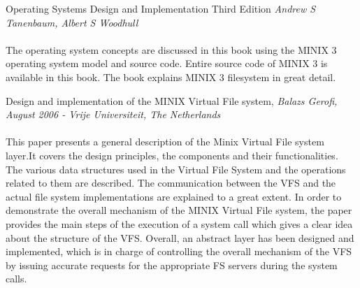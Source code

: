 Operating Systems Design and Implementation Third Edition { \em Andrew S Tanenbaum, Albert S Woodhull }\cite{ast}
\\
\\
The operating system concepts are discussed in this book using the MINIX 3 operating system model and source code. Entire source code of MINIX 3 is available in this book. The book explains MINIX 3 filesystem in great detail. 


\vspace{10mm}
 Design and implementation of the MINIX Virtual File system, { \em Balazs Gerofi, August 2006 - Vrije Universiteit, The Netherlands
}\cite{vfs}
\\
\\
This paper presents a general description of the Minix Virtual File system layer.It covers the design principles, the components and their functionalities.
The various data structures used in the Virtual File System and the operations related to them are described. The communication between the VFS and the actual file system implementations are explained to a great extent.
In order to demonstrate the overall mechanism of the MINIX Virtual File system, the paper provides the main steps of the execution of a system call which gives a clear idea about the structure of the VFS.
Overall, an abstract layer has been designed and implemented, which is in charge of controlling the overall mechanism of the VFS by issuing accurate requests for the appropriate FS servers during the system calls.






